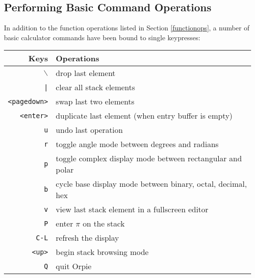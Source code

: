 \documentclass[11pt,notitlepage]{article}
\begin{document}
\subsection{Performing Basic Command Operations}
\label{rectpolar}
\label{anglemode}
\label{basemode}
In addition to the function operations listed in Section \ref{functionops},
a number of basic calculator commands have been bound to single keypresses:
\begin{center}
   \begin{tabular}[t]{|r|l|}
      \hline Keys & Operations \\
      \hline
      {\tt $\backslash$} & drop last element \\
      {\tt |} & clear all stack elements \\
      {\tt <pagedown>} & swap last two elements \\
      {\tt <enter>} & duplicate last element (when entry buffer is empty) \\
      {\tt u} & undo last operation \\
      {\tt r} & toggle angle mode between degrees and radians \\
      {\tt p} & toggle complex display mode between rectangular and polar \\
      {\tt b} & cycle base display mode between binary, octal, decimal, hex \\
      {\tt v} & view last stack element in a fullscreen editor \\
      {\tt P} & enter $\pi$ on the stack \\
      {\tt C-L} & refresh the display \\
      {\tt <up>} & begin stack browsing mode \\
      {\tt Q} & quit Orpie \\
      \hline
   \end{tabular}
\end{center}
\end{document}
